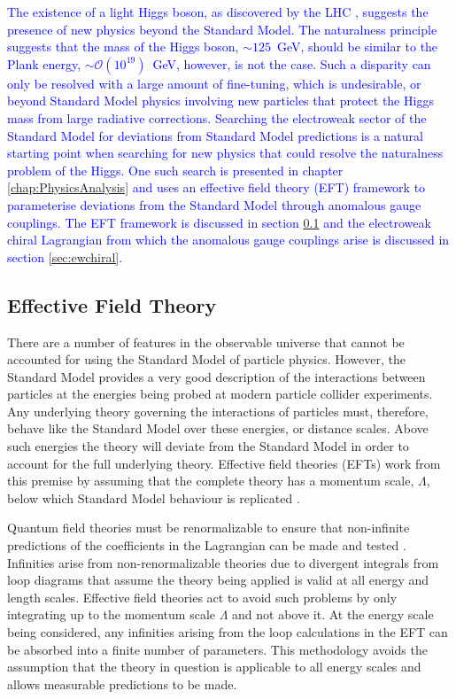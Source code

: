 \textcolor{blue}{The existence of a light Higgs boson, as discovered by the LHC \cite{Chatrchyan:2012xdj, Aad:2012tfa}, suggests the presence of new physics beyond the Standard Model.  The naturalness principle suggests that the mass of the Higgs boson, $\sim 125$~GeV, should be similar to the Plank energy, $\sim \mathcal{O}(10^{19})$~GeV, however, is not the case.  Such a disparity can only be resolved with a large amount of fine-tuning, which is undesirable, or beyond Standard Model physics involving new particles that protect the Higgs mass from large radiative corrections.  Searching the electroweak sector of the Standard Model for deviations from Standard Model predictions is a natural starting point when searching for new physics that could resolve the naturalness problem of the Higgs.  One such search is presented in chapter \ref{chap:PhysicsAnalysis} and uses an effective field theory (EFT) framework to parameterise deviations from the Standard Model through anomalous gauge couplings.  The EFT framework is discussed in section \ref{sec:eft} and the electroweak chiral Lagrangian from which the anomalous gauge couplings arise is discussed in section \ref{sec:ewchiral}.}


\subsection{Effective Field Theory}
\label{sec:eft}
There are a number of features in the observable universe that cannot be accounted for using the Standard Model of particle physics.  However, the Standard Model provides a very good description of the interactions between particles at the energies being probed at modern particle collider experiments.  Any underlying theory governing the interactions of particles must, therefore, behave like the Standard Model over these energies, or distance scales.  Above such energies the theory will deviate from the Standard Model in order to account for the full underlying theory.  Effective field theories (EFTs) work from this premise by assuming that the complete theory has a momentum scale, $\Lambda$, below which Standard Model behaviour is replicated \cite{Degrande:2013rea, Arzt:1993gz}.  

Quantum field theories must be renormalizable to ensure that non-infinite predictions of the coefficients in the Lagrangian can be made and tested \cite{Gripaios:2015qya}.  Infinities arise from non-renormalizable theories due to divergent integrals from loop diagrams that assume the theory being applied is valid at all energy and length scales.  Effective field theories act to avoid such problems by only integrating up to the momentum scale $\Lambda$ and not above it.  At the energy scale being considered, any infinities arising from the loop calculations in the EFT can be absorbed into a finite number of parameters.  This methodology avoids the assumption that the theory in question is applicable to all energy scales and allows measurable predictions to be made.  

